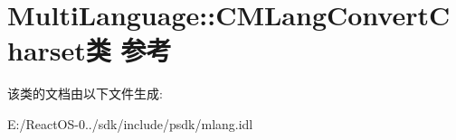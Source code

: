 \hypertarget{class_multi_language_1_1_c_m_lang_convert_charset}{}\section{Multi\+Language\+:\+:C\+M\+Lang\+Convert\+Charset类 参考}
\label{class_multi_language_1_1_c_m_lang_convert_charset}


该类的文档由以下文件生成\+:\begin{DoxyCompactItemize}
\item 
E\+:/\+React\+O\+S-\/0../sdk/include/psdk/mlang.\+idl\end{DoxyCompactItemize}
